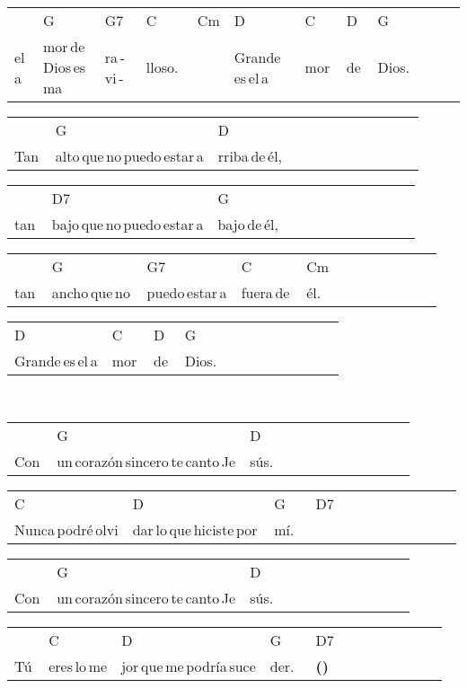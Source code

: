 \begin{multicols}{2}
\begin{minipage}{\columnwidth}
\noindent
\begin{tabular}{llllllllllll}
&G&G7&C&Cm&D&C&D&G\\
el\,a&mor\,de\,Dios\,es\,ma&ra\,-\,vi\,-\,&lloso.\,\,&\,\,&Grande\,es\,el\,a&mor\,&de\,&Dios.
\end{tabular}

\noindent
\begin{tabular}{llllllllllll}
&G&D\\
Tan\,&alto\,que\,no\,puedo\,estar\,a&rriba\,de\,él,
\end{tabular}

\noindent
\begin{tabular}{llllllllllll}
&D7&G\\
tan\,&bajo\,que\,no\,puedo\,estar\,a&bajo\,de\,él,
\end{tabular}

\noindent
\begin{tabular}{llllllllllll}
&G&G7&C&Cm\\
tan\,&ancho\,que\,no\,&puedo\,estar\,a&fuera\,de\,&él.
\end{tabular}

\noindent
\begin{tabular}{llllllllllll}
D&C&D&G\\
Grande\,es\,el\,a&mor\,&de\,&Dios.
\end{tabular}
\end{minipage}\\

\noindent
\begin{minipage}{\columnwidth}
\noindent
\noindent
\begin{tabular}{llllllllllll}
&G&D\\
Con\,&un\,corazón\,sincero\,te\,canto\,Je&sús.
\end{tabular}

\noindent
\begin{tabular}{llllllllllll}
C&D&G&D7\\
Nunca\,podré\,olvi&dar\,lo\,que\,hiciste\,por\,&mí.\,\,\,&
\end{tabular}

\noindent
\begin{tabular}{llllllllllll}
&G&D\\
Con\,&un\,corazón\,sincero\,te\,canto\,Je&sús.
\end{tabular}

\noindent
\begin{tabular}{llllllllllll}
&C&D&G&D7\\
Tú\,&eres\,lo\,me&jor\,que\,me\,podría\,suce&der.\,\,\,&\textbf{(\texttimes2)}\\\hline
\end{tabular}


\end{minipage}
\end{multicols}
